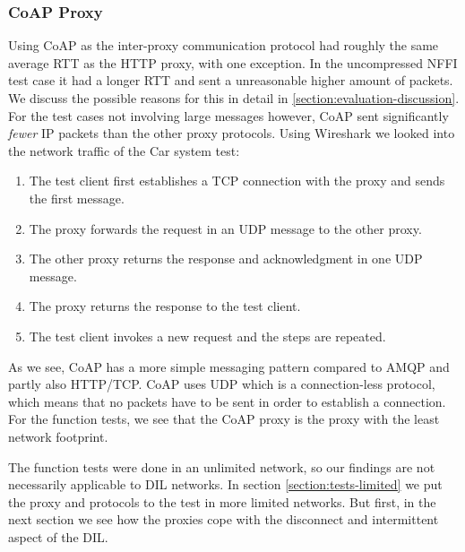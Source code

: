 \subsubsection{CoAP Proxy}

Using CoAP as the inter-proxy communication protocol had roughly the same
average RTT as the HTTP proxy, with one exception. In the uncompressed NFFI test
case it had a longer RTT and sent a unreasonable higher amount of packets. We
discuss the possible reasons for this in detail in
\cref{section:evaluation-discussion}. For the test cases not involving large
messages however, CoAP sent significantly \textit{fewer} IP packets than the
other proxy protocols. Using Wireshark we looked into the network traffic of the
Car system test:

\begin{enumerate}

    \item The test client first establishes a TCP connection with the proxy and sends
    the first message.

    \item The proxy forwards the request in an UDP message to the other proxy.

    \item The other proxy returns the response and acknowledgment in one UDP
    message.

    \item The proxy returns the response to the test client.

    \item The test client invokes a new request and the steps are repeated.


\end{enumerate}

As we see, CoAP has a more simple messaging pattern compared to AMQP and partly
also HTTP/TCP. CoAP uses UDP which is a connection-less protocol, which means
that no packets have to be sent in order to establish a connection. For the
function tests, we see that the CoAP proxy is the proxy with the least network
footprint.

The function tests were done in an unlimited network, so our findings are not
necessarily applicable to DIL networks. In section \cref{section:tests-limited}
we put the proxy and protocols to the test in more limited networks. But first,
in the next section we see how the proxies cope with the disconnect and
intermittent aspect of the DIL.


